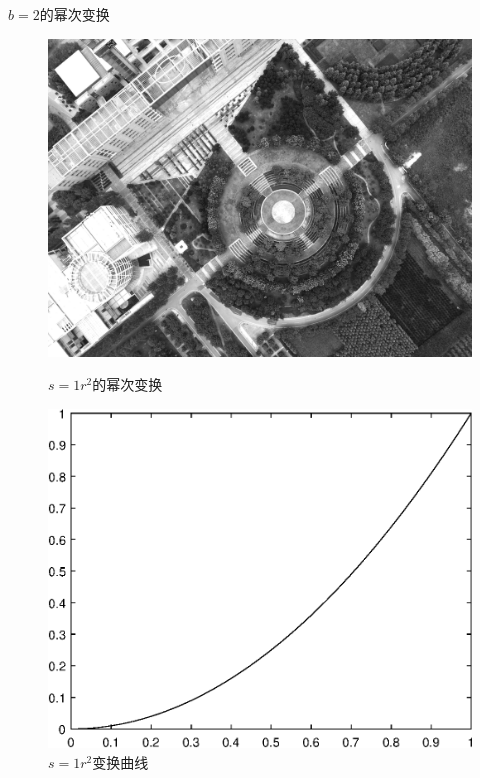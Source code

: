$b=2$的幂次变换
\begin{figure}[H]
	\centering
	\begin{minipage}{0.45\linewidth}
		\includegraphics[width=\linewidth]{figure/DJI_0027_Gamma_200.png}
		\caption{$s=1r^2$的幂次变换}
	\end{minipage}
	\begin{minipage}{0.45\linewidth}
		\includegraphics[width=\linewidth]{figure/DJI_0027_Gamma_200_Graph.eps}
		\caption{$s=1r^2$变换曲线}
	\end{minipage}
\end{figure}
